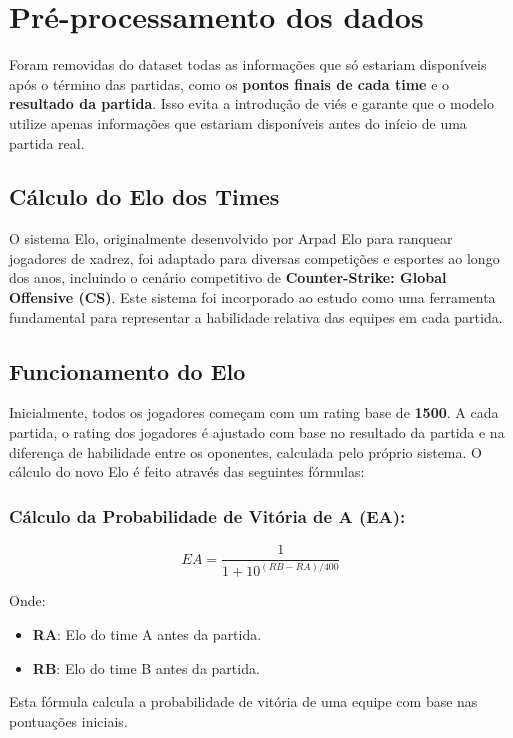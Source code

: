 \documentclass[a4paper,times,12pt]{article}
\begin{document}
\section{Pré-processamento dos dados}
\hspace{+15pt}
Foram removidas do dataset todas as informações que só estariam disponíveis após o término das partidas, como os \textbf{pontos finais de cada time} e o \textbf{resultado da partida}. Isso evita a introdução de viés e garante que o modelo utilize apenas informações que estariam disponíveis antes do início de uma partida real.
\subsection{Cálculo do Elo dos Times}

\hspace{+15pt}
O sistema Elo, originalmente desenvolvido por Arpad Elo para ranquear jogadores de xadrez, foi adaptado para diversas competições e esportes ao longo dos anos, incluindo o cenário competitivo de \textbf{Counter-Strike: Global Offensive (CS)}. Este sistema foi incorporado ao estudo como uma ferramenta fundamental para representar a habilidade relativa das equipes em cada partida.

\subsection{Funcionamento do Elo}

\hspace{+15pt}
Inicialmente, todos os jogadores começam com um rating base de \textbf{1500}. A cada partida, o rating dos jogadores é ajustado com base no resultado da partida e na diferença de habilidade entre os oponentes, calculada pelo próprio sistema. O cálculo do novo Elo é feito através das seguintes fórmulas:

\subsubsection{Cálculo da Probabilidade de Vitória de A (EA):}
\[
  EA = \frac{1}{1 + 10^{(RB - RA)/400}}
\]

Onde:
\begin{itemize}
  \item \textbf{RA}: Elo do time A antes da partida.
  \item \textbf{RB}: Elo do time B antes da partida.
\end{itemize}

Esta fórmula calcula a probabilidade de vitória de uma equipe com base nas pontuações iniciais.
\end{document}

